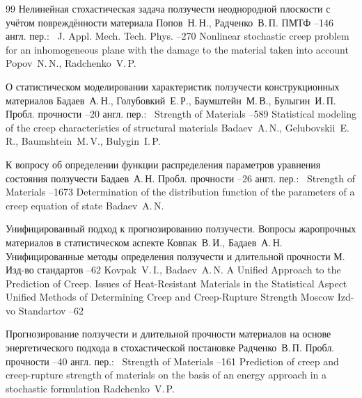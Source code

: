 \begin{thebibliography}{99}
\paper Нелинейная стохастическая задача ползучести неоднородной плоскости с учётом повреждённости материала
\by Попов~Н.\,Н., Радченко~В.\,П. 
\jour ПМТФ
--146
\transl англ. пер.:~
\jour J. Appl. Mech. Tech. Phys. 
--270
\paper Nonlinear stochastic creep problem for an inhomogeneous plane with the damage to the material taken into account
\by Popov~N.\,N., Radchenko~V.\,P.


\paper О статистическом моделировании характеристик ползучести конструкционных материалов
\by Бадаев~А.\,Н., Голубовкий~Е.\,Р., Баумштейн~М.\,В., Булыгин~И.\,П.
\jour Пробл. прочности
--20
\transl англ. пер.:~
\jour Strength of Materials
--589
\paper Statistical modeling of the creep characteristics of structural materials
\by Badaev~A.\,N., Gelubovskii~E.\,R., Baumshtein~M.\,V., Bulygin~I.\,P.


\paper К вопросу об определении функции распределения параметров уравнения состояния ползучести
\by Бадаев~А.\,Н. 
\jour Пробл. прочности
--26
\transl англ. пер.:~
\jour Strength of Materials
--1673
\paper Determination of the distribution function of the parameters of a creep equation of state
\by Badaev~A.\,N.


\paper Унифицированный подход к прогнозированию ползучести. Вопросы жаропрочных материалов в статистическом аспекте
\by Ковпак~В.\,И., Бадаев~А.\,Н. 
\inbook Унифицированные методы определения ползучести и длительной прочности
\publaddr М.
\publ Изд-во стандартов
--62
\misctransl
\by Kovpak~V.\,I.,  Badaev~A.\,N.
\paper A Unified Approach to the Prediction of Creep. Issues of Heat-Resistant Materials in the Statistical Aspect
\inbook Unified Methods of Determining Creep and Creep-Rupture Strength
\publaddr Moscow
\publ Izd-vo Standartov
--62

\paper Прогнозирование ползучести и длительной прочности материалов на основе энергетического подхода в стохастической постановке
\by Радченко~В.\,П. 
\jour Пробл. прочности
--40
\transl англ. пер.:~
\jour Strength of Materials
--161
\paper  Prediction of creep and creep-rupture strength of materials on the basis of an energy approach in a stochastic formulation
\by  Radchenko~V.\,P.



\end{thebibliography}
